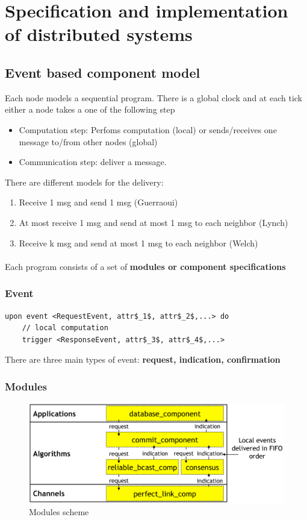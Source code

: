 \section{Specification and implementation of distributed systems}

\subsection{Event based component model}
Each node models a sequential program. There is a global clock
and at each tick either a node takes a one of the following step
\begin{itemize}
	\item Computation step: Perfoms computation (local) or
	sends/receives one message to/from other nodes (global)
	\item Communication step: deliver a message.
\end{itemize}
There are different models for the delivery:
\begin{enumerate}
    \item Receive 1 msg and send 1 msg (Guerraoui)
    \item At most receive 1 msg and send at most 1 msg to each neighbor (Lynch)
    \item Receive k msg and send at most 1 msg to each neighbor (Welch)
\end{enumerate}


\paragraph{ }
Each program consists of a set of \textbf{modules or component
specifications}

\subsubsection{Event}
\begin{lstlisting}[mathescape]
upon event <RequestEvent, attr$_1$, attr$_2$,...> do
    // local computation
    trigger <ResponseEvent, attr$_3$, attr$_4$,...>
\end{lstlisting}


There are three main types of event: \textbf{request, indication,
confirmation}


\subsubsection{Modules}

\begin{figure}[!ht]
    \centering
    \includegraphics[width=0.6\linewidth]{img/module.png}
    \caption{Modules scheme}
\end{figure}
\FloatBarrier{}

